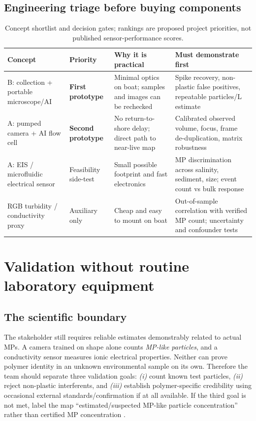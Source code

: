 \documentclass[10pt,a4paper]{article}
\begin{document}
\subsection{Engineering triage before buying components}
\begin{table}[H]\centering\footnotesize
\caption{Concept shortlist and decision gates; rankings are proposed project priorities, not published sensor-performance scores.}\label{tab:triage}
\begin{tabularx}{\linewidth}{@{}p{2.7cm}p{2.0cm}XX@{}}\toprule
Concept & Priority & Why it is practical & Must demonstrate first \\\midrule
B: collection + portable microscope/AI & \textbf{First prototype} & Minimal optics on boat; samples and images can be rechecked & Spike recovery, non-plastic false positives, repeatable particles/L estimate \\
A: pumped camera + AI flow cell & \textbf{Second prototype} & No return-to-shore delay; direct path to near-live map & Calibrated observed volume, focus, frame de-duplication, matrix robustness \\
A: EIS / microfluidic electrical sensor & Feasibility side-test & Small possible footprint and fast electronics & MP discrimination across salinity, sediment, size; event count vs bulk response \\
RGB turbidity / conductivity proxy & Auxiliary only & Cheap and easy to mount on boat & Out-of-sample correlation with verified MP count; uncertainty and confounder tests \\
\bottomrule\end{tabularx}
\end{table}

\section{Validation without routine laboratory equipment}
\subsection{The scientific boundary}
The stakeholder still requires reliable estimates demonstrably related to actual MPs. A camera trained on shape alone counts \emph{MP-like particles}, and a conductivity sensor measures ionic electrical properties. Neither can prove polymer identity in an unknown environmental sample on its own. Therefore the team should separate three validation goals: \emph{(i)} count known test particles, \emph{(ii)} reject non-plastic interferents, and \emph{(iii)} establish polymer-specific credibility using occasional external standards/confirmation if at all available. If the third goal is not met, label the map ``estimated/suspected MP-like particle concentration'' rather than certified MP concentration \cite{Blevins2021,ErniCassola2017,Ermolin2024}.
\end{document}
